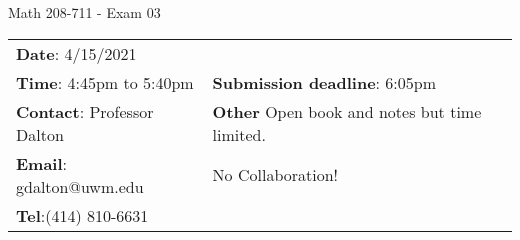 \documentclass[12pt,letterpaper]{article}
\author{Gary Dalton <gdalton@uwm.edu>}
\begin{document}
	
\begin{center} \LARGE Math 208-711 - Exam 03\end{center}%
\smallskip

\begin{center} \begin{tabular}{l l}
		\textbf{Date}: 4/15/2021 & \\
		\textbf{Time}: 4:45pm to 5:40pm &
		\textbf{Submission deadline}: 6:05pm\\
		\textbf{Contact}: Professor Dalton
		& \textbf{Other} Open book and notes but time limited. \\
		\textbf{Email}: gdalton@uwm.edu 
		& \qquad No Collaboration! \\
		\textbf{Tel}:(414) 810-6631
\end{tabular} \end{center}%
\end{document}
